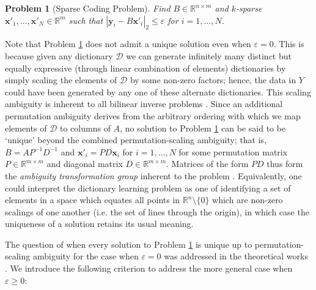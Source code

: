 \documentclass[journal, twocolumn]{IEEEtran}
\newtheorem{problem}{Problem}
\begin{document}
\begin{problem}[Sparse Coding Problem]\label{InverseProblem}
Find $B \in \mathbb{R}^{n \times m}$ and $k$-sparse $\mathbf{x}'_1, \ldots, \mathbf{x}'_N \in \mathbb{R}^m$ such that $|\mathbf{y}_i - B\mathbf{x}'_i|_2 \leq \varepsilon$ for $i = 1, \ldots, N$.
\end{problem}

Note that Problem \ref{InverseProblem} does not admit a unique solution even when $\varepsilon = 0$. This is because given any dictionary $\mathcal{D}$ we can generate infinitely many distinct but equally expressive (through linear combination of elements) dictionaries by simply scaling the elements of $\mathcal{D}$ by some non-zero factors; hence, the data in $Y$ could have been generated by any one of these alternate dictionaries. This scaling ambiguity is inherent to all bilinear inverse problems \cite{Choudhary14}. Since an additional permutation ambiguity derives from the arbitrary ordering with which we map elements of $\mathcal{D}$ to columns of $A$, no solution to Problem \ref{InverseProblem} can be said to be `unique' beyond the combined permutation-scaling ambiguity; that is, $B = AP^{-1}D^{-1}$ and $\mathbf{x}'_i = PD\mathbf{x}_i$ for $i = 1, \ldots, N$ for some permutation matrix $P \in \mathbb{R}^{m \times m}$ and diagonal matrix $D \in \mathbb{R}^{m \times m}$. Matrices of the form $PD$ thus form the \emph{ambiguity transformation group} inherent to the problem \cite{Li15}. Equivalently, one could interpret the dictionary learning problem as one of identifying a set of elements in a space which equates all points in $\mathbb{R}^{n} \setminus \{0\}$ which are non-zero scalings of one another (i.e. the set of lines through the origin), in which case the uniqueness of a solution retains its usual meaning. 

The question of when every solution to Problem \ref{InverseProblem} is unique up to permutation-scaling ambiguity for the case when $\varepsilon = 0$ was addressed in the theoretical works \cite{Georgiev05, Aharon06, Hillar15}. We introduce the following criterion to address the more general case when $\varepsilon \geq 0$:
\end{document}
